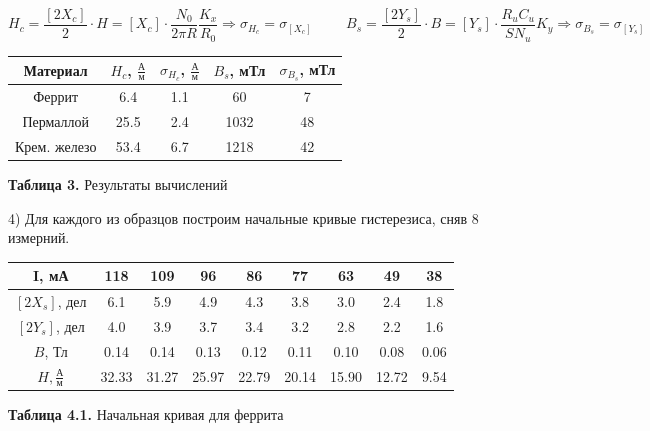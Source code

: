 \documentclass{article}
\begin{document}
\begin{equation}
    H_{c} = \frac{[2X_{c}]}{2} \cdot H = [X_{c}] \cdot \frac{N_{0}}{2\pi R} \frac{K_{x}}{R_{0}} \Rightarrow \sigma_{H_{c}} = \sigma_{[X_{c}]} \hspace{1cm}
    B_{s} = \frac{[2Y_{s}]}{2} \cdot B = [Y_{s}] \cdot \frac{R_{u}C_{u}}{S N_{u}} K_{y} \Rightarrow \sigma_{B_{s}} = \sigma_{[Y_{s}]}
\end{equation}

\begin{center}
    \begin{tabular}{|c|c|c|c|c|}
		\hline
		Материал     & $H_c$, \(\frac{\text{А}}{\text{м}}\) & $\sigma_{H_c}$,  \(\frac{\text{А}}{\text{м}}\) & $B_s$,  мТл & $\sigma_{B_s}$, мТл \\ \hline
		Феррит       & 6.4       & 1.1                 & 60      & 7              \\ \hline
		Пермаллой    & 25.5      & 2.4                & 1032      & 48               \\ \hline
		Крем. железо & 53.4      & 6.7                & 1218      & 42               \\ \hline
	\end{tabular}
	
	\textbf{Таблица 3.} Результаты вычислений
\end{center}

4) Для каждого из образцов построим начальные кривые гистерезиса, сняв 8 измерний.

\begin{center}
    \begin{tabular}{|c|c|c|c|c|c|c|c|c|}
        \hline
        I, мА & 118 & 109 & 96 & 86 & 77 & 63 & 49 & 38 \\
        \hline
        \([2X_{s}]\), дел & 6.1 & 5.9 & 4.9 & 4.3 & 3.8 & 3.0 & 2.4 & 1.8 \\
        \hline
        \([2Y_{s}]\), дел & 4.0 & 3.9 & 3.7 & 3.4 & 3.2 & 2.8 & 2.2 & 1.6 \\
        \hline
        \(B\), Тл & 0.14 & 0.14 & 0.13 & 0.12 & 0.11 & 0.10 & 0.08 & 0.06 \\
        \hline
        \(H, \frac{\text{А}}{\text{м}}\) & 32.33 & 31.27 & 25.97 & 22.79 & 20.14 & 15.90 & 12.72 & 9.54 \\
        \hline
    \end{tabular}
    
    \textbf{Таблица 4.1.} Начальная кривая для феррита
\end{center}
    
\end{document}
